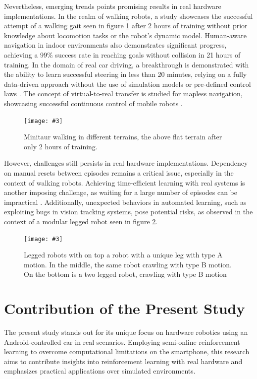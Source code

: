 \documentclass[12pt]{report}
\newcommand\insertfigure[5]{
\begin{figure}[#1]
\begin{center}
\texttt{[image: \#3]}
\end{center}
\caption{#4}
\label{#5}
\end{figure}
}
\begin{document}
Nevertheless, emerging trends points promising results in real hardware implementations. In the realm of walking robots, a study \cite{bib:walk} showcases the successful attempt of a walking gait seen in figure  \ref{fig:minitaur} after 2 hours of training without prior knowledge about locomotion tasks or the robot's dynamic model. Human-aware navigation in indoor environments also demonstrates significant progress, achieving a 99\% success rate in reaching goals without collision in 21 hours of training\cite{bib:sarl}. In the domain of real car driving, a breakthrough is demonstrated with the ability to learn successful steering in less than 20 minutes, relying on a fully data-driven approach without the use of simulation models or pre-defined control laws \cite{bib:realcar}. The concept of virtual-to-real transfer is studied for mapless navigation, showcasing successful continuous control of mobile robots \cite{bib:vtr}.

\insertfigure{th}{1.0\textwidth}{minitaur.png}{Minitaur \cite{bib:walk} walking in different terrains, the above flat terrain after only 2 hours of training.}{fig:minitaur}


However, challenges still persists in real hardware implementations. Dependency on manual resets between episodes remains a critical issue, especially in the context of walking robots\cite{bib:walk}. Achieving time-efficient learning with real systems is another imposing challenge, as waiting for a large number of episodes can be impractical \cite{bib:vtr}. Additionally, unexpected behaviors in automated learning, such as exploiting bugs in vision tracking systems, pose potential risks, as observed in the context of a modular legged robot \cite{bib:leg} seen in figure \ref{fig:leg}.

\insertfigure{th}{1.0\textwidth}{leg.png}{Legged robots \cite{bib:leg} with on top a robot with a unique leg with type A motion. In the middle, the same robot crawling with type B motion. On the bottom is a two legged robot, crawling with type B motion}{fig:leg}

\section{Contribution of the Present Study}
\label{sub:Contribution_present_study}

The present study stands out for its unique focus on hardware robotics using an Android-controlled car in real scenarios. Employing semi-online reinforcement learning to overcome computational limitations on the smartphone, this research aims to contribute insights into reinforcement learning with real hardware and emphasizes practical applications over simulated environments.
\end{document}
